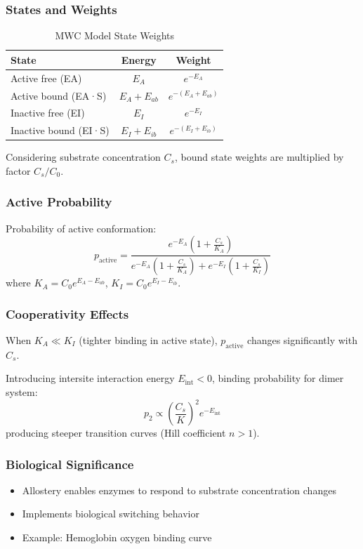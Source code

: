\documentclass[12pt]{article}
\begin{document}
\subsubsection{States and Weights}
\begin{table}[H]
\centering
\caption{MWC Model State Weights}
\begin{tabular}{lcc}
\toprule
State & Energy & Weight \\
\midrule
Active free (EA) & $E_A$ & $e^{-E_A}$ \\
Active bound (EA·S) & $E_A + E_{ab}$ & $e^{-(E_A + E_{ab})}$ \\
Inactive free (EI) & $E_I$ & $e^{-E_I}$ \\
Inactive bound (EI·S) & $E_I + E_{ib}$ & $e^{-(E_I + E_{ib})}$ \\
\bottomrule
\end{tabular}
\end{table}

Considering substrate concentration $C_s$, bound state weights are multiplied by factor $C_s / C_0$.

\subsubsection{Active Probability}
Probability of active conformation:
\begin{equation}
p_{\text{active}} = \frac{e^{-E_A} \left(1 + \frac{C_s}{K_A}\right)}{e^{-E_A} \left(1 + \frac{C_s}{K_A}\right) + e^{-E_I} \left(1 + \frac{C_s}{K_I}\right)}
\end{equation}
where $K_A = C_0 e^{E_A - E_{ab}}$, $K_I = C_0 e^{E_I - E_{ib}}$.

\subsubsection{Cooperativity Effects}
When $K_A \ll K_I$ (tighter binding in active state), $p_{\text{active}}$ changes significantly with $C_s$.

Introducing intersite interaction energy $E_{\text{int}} < 0$, binding probability for dimer system:
\begin{equation}
p_2 \propto \left(\frac{C_s}{K}\right)^2 e^{-E_{\text{int}}}
\end{equation}
producing steeper transition curves (Hill coefficient $n > 1$).

\subsubsection{Biological Significance}
\begin{itemize}
    \item Allostery enables enzymes to respond to substrate concentration changes
    \item Implements biological switching behavior
    \item Example: Hemoglobin oxygen binding curve
\end{itemize}
\end{document}
